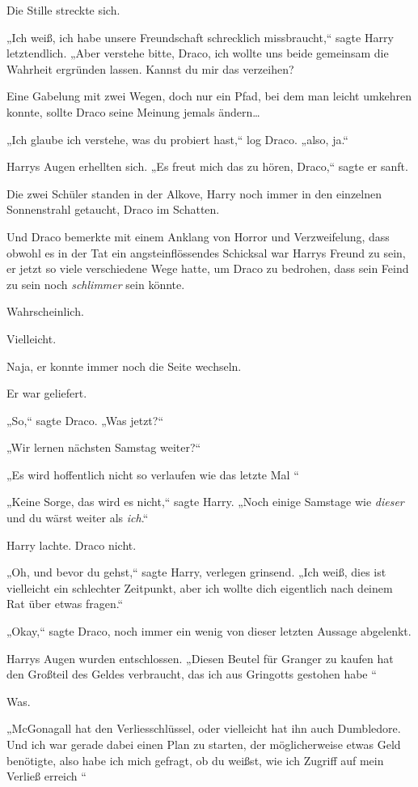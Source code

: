 {Die Stille streckte sich.

„Ich weiß, ich habe unsere Freundschaft schrecklich missbraucht,“ sagte Harry letztendlich. „Aber verstehe bitte, Draco, ich wollte uns beide gemeinsam die Wahrheit ergründen lassen. Kannst du mir das verzeihen?

Eine Gabelung mit zwei Wegen, doch nur ein Pfad, bei dem man leicht umkehren konnte, sollte Draco seine Meinung jemals ändern…

„Ich glaube ich verstehe, was du probiert hast,“ log Draco. „also, ja.“

Harrys Augen erhellten sich. „Es freut mich das zu hören, Draco,“ sagte er sanft.

Die zwei Schüler standen in der Alkove, Harry noch immer in den einzelnen Sonnenstrahl getaucht, Draco im Schatten.

Und Draco bemerkte mit einem Anklang von Horror und Verzweifelung, dass obwohl es in der Tat ein angsteinflössendes Schicksal war Harrys Freund zu sein, er jetzt so viele verschiedene Wege hatte, um Draco zu bedrohen, dass sein Feind zu sein noch \emph{schlimmer} sein könnte.

Wahrscheinlich.

Vielleicht.

Naja, er konnte immer noch die Seite wechseln.

Er war geliefert.

„So,“ sagte Draco. „Was jetzt?“

„Wir lernen nächsten Samstag weiter?“

„Es wird hoffentlich nicht so verlaufen wie das letzte Mal \later“

„Keine Sorge, das wird es nicht,“ sagte Harry. „Noch einige Samstage wie \emph{dieser} und du wärst weiter als \emph{ich}.“

Harry lachte. Draco nicht.

„Oh, und bevor du gehst,“ sagte Harry, verlegen grinsend. „Ich weiß, dies ist vielleicht ein schlechter Zeitpunkt, aber ich wollte dich eigentlich nach deinem Rat über etwas fragen.“

„Okay,“ sagte Draco, noch immer ein wenig von dieser letzten Aussage abgelenkt.

Harrys Augen wurden entschlossen. „Diesen Beutel für Granger zu kaufen hat den Großteil des Geldes verbraucht, das ich aus Gringotts gestohen habe \later“

Was.

„\laterund McGonagall hat den Verliesschlüssel, oder vielleicht hat ihn auch Dumbledore. Und ich war gerade dabei einen Plan zu starten, der möglicherweise etwas Geld benötigte, also habe ich mich gefragt, ob du weißst, wie ich Zugriff auf mein Verließ erreich \later“

}
